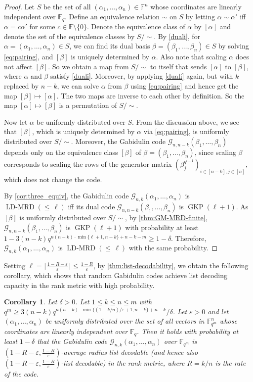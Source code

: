 \documentclass[11pt]{article}
\theoremstyle{plain}
\newtheorem{cor}[thm]{Corollary}
\theoremstyle{definition}
\theoremstyle{remark}
\newcommand{\ldmrd}[1]{\operatorname{LD-MRD}({\leq}\,#1)}
\newcommand{\F}{\mathbb{F}}
\renewcommand{\epsilon}{\varepsilon}
\def \mG {\mathcal{G}}
\begin{document}
\begin{proof}
Let $S$ be the set of all $(\alpha_1,\dots,\alpha_n)\in \F^n$ whose coordinates are linearly independent over $\F_q$. Define an equivalence relation $\sim$ on $S$ by letting $\alpha\sim \alpha'$ iff $\alpha=c\alpha'$ for some $c\in \F\setminus\{0\}$. Denote the equivalence class of $\alpha$ by $[\alpha]$ and denote the set of the equivalence classes by $S/\sim$.
By \cref{duali}, for $\alpha=(\alpha_1,\dots,\alpha_n)\in S$, we can find its dual basis $\beta=(\beta_1,\dots,\beta_n)\in S$ by solving \eqref{eq:pairing}, and $[\beta]$ is uniquely determined by $\alpha$. Also note that scaling $\alpha$ does not affect $[\beta]$.
So we obtain a map from $S/\sim$ to itself that sends $[\alpha]$ to $[\beta]$, where $\alpha$ and $\beta$ satisfy \cref{duali}.
Moreover, by applying \cref{duali} again, but with $k$ replaced by $n-k$, we can solve $\alpha$ from $\beta$ using \eqref{eq:pairing} and hence get the map $[\beta]\mapsto [\alpha]$. The two maps are inverse to each other by definition. So the map $[\alpha]\mapsto [\beta]$ is a permutation of $S/\sim$. 

Now let $\alpha$ be uniformly distributed over $S$. From the discussion above, we see that $[\beta]$, which is uniquely determined by $\alpha$ via \eqref{eq:pairing}, is uniformly distributed over $S/\sim$.
Moreover, the Gabidulin code $\mG_{n,n-k}(\beta_1,\dots, \beta_n)$ depends only on the equivalence class $[\beta]$ of $\beta=(\beta_1,\dots, \beta_n)$, since scaling $\beta$ corresponds to scaling the rows of the generator matrix $\left(\beta_{j}^{q^{i-1}}\right)_{i\in [n-k], j\in [n]}$, which does not change the code.

By \cref{cor:three_equiv}, the Gabidulin code $\mG_{n,k}(\alpha_1,\dots, \alpha_n)$ is $\ldmrd{\ell}$ iff its dual code $\mG_{n,n-k}(\beta_1,\dots, \beta_n)$ is $\operatorname{GKP}(\ell+1)$.
As $[\beta]$ is uniformly distributed over $S/\sim$, by \cref{thm:GM-MRD-finite}, $\mG_{n,n-k}(\beta_1,\dots, \beta_n)$ is $\operatorname{GKP}(\ell+1)$ with probability at least $1-3(n-k)q^{n(n-k)\cdot\min\{\ell+1,n-k\}+n-k-m}\geq 1-\delta$. Therefore, $\mG_{n,k}(\alpha_1,\dots, \alpha_n)$ is $\ldmrd{\ell}$ with the same probability.
\end{proof}
Setting $\ell=\lceil\frac{1-R-\epsilon}{\epsilon}\rceil\leq \frac{1-R}{\epsilon}$, by \cref{thm:list-decodability}, we obtain the following corollary, which shows that random Gabidulin codes achieve list decoding capacity in the rank metric with high probability.
\begin{cor}\label{cor:mm1}
Let $\delta>0$. Let $1\leq k\leq n\leq m$ with $q^m\geq 3(n-k)q^{n(n-k)\cdot\min\{(1-k/n)/\epsilon+1,n-k\}+n-k}/\delta$.
Let $\epsilon>0$ and let $(\alpha_1,\dots,\alpha_n)$ be uniformly distributed over the set of all vectors in $\F_{q^m}^n$ whose coordinates are linearly independent over $\F_q$. Then it holds with probability at least $1-\delta$ that the Gabidulin code $\mG_{n,k}(\alpha_1,\dots, \alpha_n)$ over $\F_{q^m}$ is $\left(1-R-\epsilon,\frac{1-R}{\epsilon}\right)$-average radius list decodable (and hence also $\left(1-R-\epsilon,\frac{1-R}{\epsilon}\right)$-list decodable) in the rank metric, where $R=k/n$ is the rate of the code.  
\end{cor}
\end{document}
